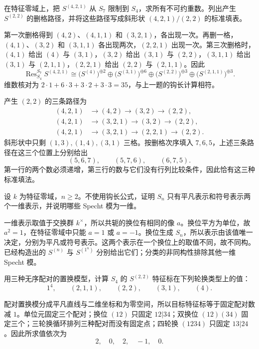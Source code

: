 \begin{exercise}\label{b5:ex:06-iterated-branch}
	在特征零域上，把 \(S^{(4,2,1)}\) 从 \(S_7\) 限制到 \(S_4\)，求所有不可约重数。列出产生 \(S^{(2,2)}\) 的删格路径，并将这些路径写成斜形状 \((4,2,1)/(2,2)\) 的标准填表。
\end{exercise}
\begin{solution}
	第一次删格得到 \((4,2)\)、\((4,1,1)\) 和 \((3,2,1)\)，各出现一次。再删一格，\((4,1)\)、\((3,2)\) 和 \((3,1,1)\) 各出现两次，\((2,2,1)\) 出现一次。第三次删格时，\((4,1)\) 给出 \((4)\) 与 \((3,1)\)，\((3,2)\) 给出 \((3,1)\) 与 \((2,2)\)，\((3,1,1)\) 给出 \((3,1)\) 与 \((2,1,1)\)，\((2,2,1)\) 给出 \((2,2)\) 与 \((2,1,1)\)。因此
	\[
		\operatorname{Res}_{S_4}^{S_7}S^{(4,2,1)} \cong \bigl(S^{(4)}\bigr)^{\oplus2} \oplus\bigl(S^{(3,1)}\bigr)^{\oplus6} \oplus\bigl(S^{(2,2)}\bigr)^{\oplus3} \oplus\bigl(S^{(2,1,1)}\bigr)^{\oplus3}.
	\]
	维数核对为 \(2\cdot1+6\cdot3+3\cdot2+3\cdot3=35\)，与上一题的钩长计算相符。

	产生 \((2,2)\) 的三条路径为
	\[
		\begin{aligned}
			(4,2,1)&\longrightarrow(4,2)\longrightarrow(3,2) \longrightarrow(2,2),\\
			(4,2,1)&\longrightarrow(3,2,1)\longrightarrow(3,2) \longrightarrow(2,2),\\
			(4,2,1)&\longrightarrow(3,2,1)\longrightarrow(2,2,1) \longrightarrow(2,2).
		\end{aligned}
	\]
	斜形状中只剩 \((1,3),(1,4),(3,1)\) 三格。按删格次序填入 \(7,6,5\)，上述三条路径在这三个位置上分别给出
	\[
		(5,6,7),\qquad(5,7,6),\qquad(6,7,5).
	\]
	第一行的两个数必须递增，第三行的数与它们没有行列比较条件，因此恰有这三种标准填法。
\end{solution}

\begin{exercise}\label{b5:ex:06-one-dimensional}
	设 \(k\) 为特征零域，\(n\geq2\)。不使用钩长公式，证明 \(S_n\) 只有平凡表示和符号表示两个一维表示，并说明哪些 Specht 模为一维。
\end{exercise}
\begin{solution}
	一维表示取值于交换群 \(k^\times\)，所以共轭的换位有相同的像 \(a\)。换位平方为单位，故 \(a^2=1\)，在特征零域中只能 \(a=1\) 或 \(a=-1\)。换位生成 \(S_n\)，所以表示由该值唯一决定，分别为平凡或符号表示。这两个表示在一个换位上的取值不同，故不同构。已经构造出的 \(S^{(n)}\) 与 \(S^{(1^n)}\) 分别给出它们；分类的非同构性排除其他一维 Specht 模。
\end{solution}

\begin{exercise}\label{b5:ex:06-22-character}
	用三种无序配对的置换模型，计算 \(S_4\) 的 \(S^{(2,2)}\) 特征标在下列轮换类型上的值：
	\[
		1^4,\qquad(2,1,1),\qquad(2,2),\qquad(3,1),\qquad(4).
	\]
\end{exercise}
\begin{solution}
	配对置换模分成平凡直线与二维坐标和为零空间，所以目标特征标等于固定配对数减 \(1\)。单位元固定三个配对；换位 \((12)\) 只固定 \(12|34\)；双换位 \((12)(34)\) 固定三个；三轮换循环排列三种配对而没有固定点；四轮换 \((1234)\) 只固定 \(13|24\)。因此所求值依次为
	\[
		2,\quad0,\quad2,\quad-1,\quad0.
	\]
\end{solution}


